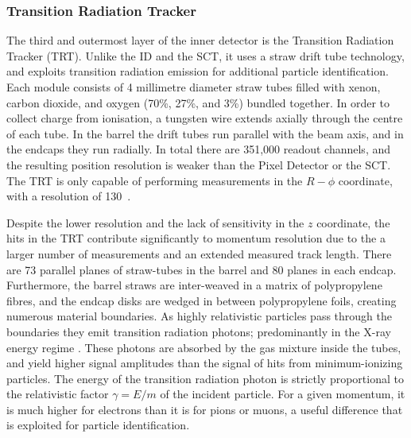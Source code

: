 \subsubsection{Transition Radiation Tracker}

The third and outermost layer of the inner detector is the Transition Radiation Tracker (TRT). Unlike the ID and the SCT, it uses a straw drift tube technology, and exploits transition radiation emission for additional particle identification. Each module consists of 4 millimetre diameter straw tubes filled with xenon, carbon dioxide, and oxygen (70\%, 27\%, and 3\%)\cite{Vogel:1537991} bundled together. In order to collect charge from ionisation, a tungsten wire extends axially through the centre of each tube. In the barrel the drift tubes run parallel with the beam axis, and in the endcaps they run radially. In total there are 351,000 readout channels, and the resulting position resolution is weaker than the Pixel Detector or the SCT. The TRT is only capable of performing measurements in the $R-\phi$ coordinate, with a resolution of \unit{130}{\mu\meter}~\cite{Vogel:1537991}. 

Despite the lower resolution and the lack of sensitivity in the $z$ coordinate, the hits in the TRT contribute significantly to momentum resolution due to the a larger number of measurements and an extended measured track length. There are 73 parallel planes of straw-tubes in the barrel and 80 planes in each endcap. Furthermore, the barrel straws are inter-weaved in a matrix of polypropylene fibres, and the endcap disks are wedged in between polypropylene foils, creating numerous material boundaries. As highly relativistic particles pass through the boundaries they emit transition radiation photons; predominantly in the X-ray energy regime \cite{Ginzburg_1996}. These photons are absorbed by the gas mixture inside the tubes, and yield higher signal amplitudes than the signal of hits from minimum-ionizing particles. The energy of the transition radiation photon is strictly proportional to the relativistic factor $\gamma=E/m$ of the incident particle. For a given momentum, it is much higher for electrons than it is for pions or muons, a useful difference that is exploited for particle identification.

